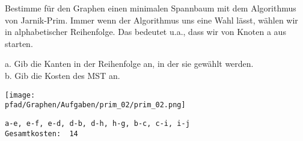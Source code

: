 ﻿\question[3]
Bestimme für den Graphen einen minimalen Spannbaum mit dem Algorithmus von Jarnik-Prim. Immer wenn der Algorithmus uns eine
Wahl lässt, wählen wir in alphabetischer Reihenfolge. Das bedeutet u.a., dass wir von Knoten a aus starten.

a. Gib die Kanten in der Reihenfolge an, in der sie gewählt werden.  \\
b. Gib die Kosten des MST an.

\texttt{[image: \\pfad/Graphen/Aufgaben/prim\_02/prim\_02.png]}
\begin{solutionbox}{3cm}
\begin{lstlisting}
a-e, e-f, e-d, d-b, d-h, h-g, b-c, c-i, i-j
Gesamtkosten:  14
\end{lstlisting}
\end{solutionbox}
